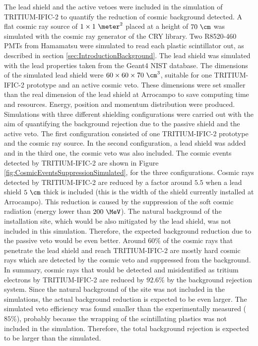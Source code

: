 The lead shield and the active vetoes were included in the simulation of TRITIUM-IFIC-2 to quantify the reduction of cosmic background detected. A flat cosmic ray source of $1 \times 1~\meter^2$ placed at a height of $70~\cm$ was simulated with the cosmic ray generator of the CRY library. Two R8520-460 PMTs from Hamamatsu were simulated to read each plastic scintillator out, as described in section \ref{sec:IntroductionBackground}. The lead shield was simulated with the lead properties taken from the Geant4 NIST database. The dimensions of the simulated lead shield were $60 \times 60 \times 70~\cm^3$, suitable for one TRITIUM-IFIC-2 prototype and an active cosmic veto. These dimensions were set smaller than the real dimension of the lead shield at Arrocampo to save computing time and resources. Energy, position and momentum distribution were produced. Simulations with three different shielding configurations were carried out with the aim of quantifying the background rejection due to the passive shield and the active veto. The first configuration consisted of one TRITIUM-IFIC-2 prototype and the cosmic ray source. In the second configuration, a lead shield was added and in the third one, the cosmic veto was also included. The cosmic events detected by TRITIUM-IFIC-2 are shown in Figure \ref{fig:CosmicEventsSuppressionSimulated}, for the three configurations. Cosmic rays detected by TRITIUM-IFIC-2 are reduced by a factor around $5.5$ when a lead shield $5~\cm$ thick is included (this is the width of the shield currently installed at Arrocampo). This reduction is caused by the suppression of the soft cosmic radiation (energy lower than $200~\MeV$). The natural background of the installation site, which would be also mitigated by the lead shield, was not included in this simulation. Therefore, the expected background reduction due to the passive veto would be even better. Around $60\%$ of the cosmic rays that penetrate the lead shield and reach TRITIUM-IFIC-2 are mostly hard cosmic rays which are detected by the cosmic veto and suppressed from the background. In summary, cosmic rays that would be detected and misidentified as tritium electrons by TRITIUM-IFIC-2 are reduced by $92.6\%$ by the background rejection system. Since the natural background of the site was not included in the simulations, the actual background reduction is expected to be even larger. The simulated veto efficiency was found smaller than the experimentally measured ($85\%$), probably because the wrapping of the scintillating plastics was not included in the simulation. Therefore, the total background rejection is expected to be larger than the simulated.

